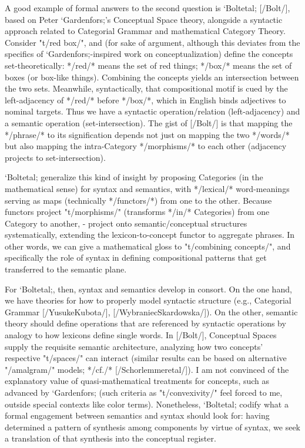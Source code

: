 A good example of formal answers to the second question is 
`Boltetal; [/Bolt/], based on Peter `Gardenfors;'s Conceptual Space 
theory, alongside a syntactic approach related to Categorial Grammar 
and mathematical Category Theory.  Consider "t/red box/", and 
(for sake of argument, although this deviates from the 
specifics of `Gardenfors;-inspired work on conceptualization) 
define the concepts set-theoretically: 
*/red/* means the set of red things; */box/* means the set of 
boxes (or box-like things).  Combining the concepts yields 
an intersection between the two sets.  Meanwhile, 
syntactically, that compositional motif is cued by the left-adjacency of 
*/red/* before */box/*, which in English binds 
adjectives to nominal targets.  Thus we have a 
syntactic operation/relation (left-adjacency) and a 
semantic operation (set-intersection).  The gist 
of [/Bolt/] is that mapping the */phrase/* to its signification 
depends not just on mapping the two */words/* but also 
mapping the intra-Category */morphisms/* to each other (adjacency 
projects to set-intersection).

`Boltetal; generalize this kind of insight by proposing  
Categories (in the mathematical sense) for syntax and semantics, 
with */lexical/* word-meanings serving as maps (technically 
*/functors/*) from one to the other.  Because functors 
project "t/morphisms/" (transforms */in/* Categories) from one Category 
to another, -%
project onto semantic/conceptual structures systematically, 
extending the lexicon-to-concept functor to aggregate 
phrases.  In other words, we can give a mathematical gloss 
to "t/combining concepts/", and specifically the role of 
syntax in defining compositional patterns that get transferred 
to the semantic plane. 

For `Boltetal;, then, syntax and semantics develop in consort.  On the 
one hand, we have theories for how to properly model syntactic 
structure (e.g., Categorial Grammar [/YusukeKubota/], [/WybraniecSkardowska/]).  On the other, semantic theory 
should define operations that are referenced by syntactic operations 
by analogy to how lexicons define single words.  In [/Bolt/], Conceptual Spaces 
supply the requisite semantic architecture, analyzing how 
two concepts' respective "t/spaces/" can interact (similar 
results can be based on alternative "/amalgram/" 
models; */cf./* [/Schorlemmeretal/]).  
I am not convinced of the explanatory value of 
quasi-mathematical treatments for concepts, such as 
advanced by `Gardenfors; (such criteria as "t/convexivity/" 
feel forced to me, outside special contexts like color terms).  
Nonetheless, `Boltetal; codify what a formal engagement 
between semantics and syntax should look for: having determined 
a pattern of synthesis among components by 
virtue of syntax, we seek a translation of that 
synthesis into the conceptual register.  


